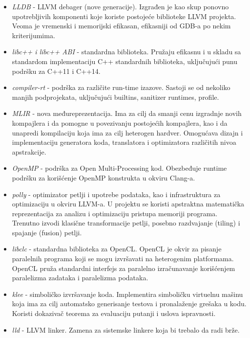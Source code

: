 \documentclass[10pt]{extarticle}
\begin{document}
\begin{itemize}
    \item \textit{LLDB} - LLVM debager (nove generacije). Izgrađen je kao skup ponovno upotrebljivih komponenti koje koriste postojeće biblioteke LLVM projekta. Veoma je vremenski i memorijski efikasan, efikasniji od GDB-a po nekim kriterijumima.
    \item \textit{libc++ i libc++ ABI} - standardna biblioteka. Pružaju efikasnu i u skladu sa standardom implementaciju C++ standardnih biblioteka, uključujući punu podršku za C++11 i C++14.
    \item \textit{compiler-rt} - podrška za različite run-time izazove. Sastoji se od nekoliko manjih podprojekata, uključujući builtins, sanitizer runtimes, profile.
    \item \textit{MLIR} - nova međureprezentacija. Ima za cilj da smanji cenu izgradnje novih kompajlera i da pomogne u povezivanju postojećih kompajlera, kao i da unapredi kompilaciju koja ima za cilj heterogen hardver. Omogućava dizajn i implementaciju generatora koda, translatora i optimizatora različitih nivoa apstrakcije. 
    \item \textit{OpenMP} - podrška za Open Multi-Processing kod. Obezbeđuje runtime podršku za korišćenje OpenMP konstrukta u okviru Clang-a.
    \item \textit{polly} - optimizator petlji i upotrebe podataka, kao i infrastruktura za optimizaciju u okviru LLVM-a. U projektu se koristi apstraktna matematička reprezentacija za analizu i optimizaciju pristupa memoriji programa. Trenutno izvodi klasične transformacije petlji, posebno razdvajanje (tiling) i spajanje (fusion) petlji.
    \item \textit{libclc} - standardna biblioteka za OpenCL. OpenCL je okvir za pisanje paralelnih programa koji se mogu izvršavati na heterogenim platformama. OpenCL pruža standardni interfejs za paralelno izračunavanje korišćenjem paralelizma zadataka i paralelizma podataka.
    \item \textit{klee} - simboličko izvršavanje koda. Implementira simboličku virtuelnu mašinu koja ima za cilj automatsko generisanje testova i pronalaženje grešaka u kodu. Koristi dokazivač teorema za evaluaciju putanji i uslova ispravnosti.
    \item \textit{lld} - LLVM linker. Zamena za sistemske linkere koja bi trebalo da radi brže.
\end{itemize}
\newpage
\end{document}
